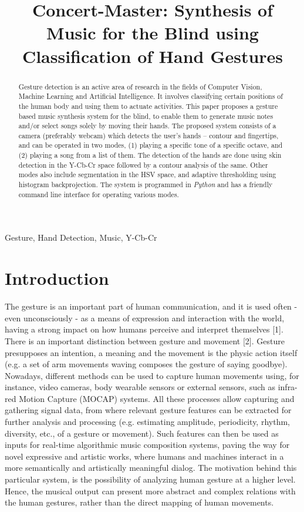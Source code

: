 \documentclass[letterpaper, 10 pt, twoside, conference]{ieeeconf}
\title{Concert-Master: Synthesis of Music for the Blind using Classification of Hand Gestures}
\begin{document}
%
\maketitle
%
\begin{abstract}

Gesture detection is an active area of research in the fields of Computer Vision,
Machine Learning and Artificial Intelligence. It involves classifying certain
positions of the human body and using them to actuate activities. This paper
proposes a gesture based music synthesis system for the blind, to enable them
to generate music notes and/or select songs solely by moving their hands. The
proposed system consists of a camera (preferably webcam) which detects the user's
hands -- contour and fingertips, and can be operated in two modes, (1) playing a
specific tone of a specific octave, and (2) playing a song from a list of them.
The detection of the hands are done using skin detection in the Y-Cb-Cr space
followed by a contour analysis of the same. Other modes also include segmentation
in the HSV space, and adaptive thresholding using histogram backprojection.
The system is programmed in \textit{Python} and has a friendly command line
interface for operating various modes.
\end{abstract}
%
\begin{keywords}
Gesture, Hand Detection, Music, Y-Cb-Cr
\end{keywords}
%
\section{Introduction}
\label{sec:intro}

The gesture is an important part of human communication,
and it is used often - even unconsciously - as a means of expression and interaction with the world, having a strong impact on how humans perceive and interpret themselves [1]. There is an important distinction between gesture and movement [2]. Gesture presupposes an intention, a meaning and the movement is the physic action itself (e.g. a set of arm movements waving composes the gesture of saying goodbye). Nowadays, different methods can be used to capture human
movements using, for instance, video cameras, body wearable sensors or external sensors, such as infra-red Motion Capture (MOCAP) systems. All these processes allow capturing and gathering signal data, from where relevant gesture features can be extracted for further analysis and processing (e.g. estimating amplitude, periodicity, rhythm, diversity, etc., of a gesture or movement). Such features can then be used as inputs for real-time algorithmic music composition systems, paving the way for novel expressive and artistic works, where humans and machines interact in a more semantically and artistically meaningful dialog. The motivation behind this particular system, is the possibility of analyzing human gesture at a higher level. Hence, the musical output can present more abstract and complex relations with the human gestures, rather than the direct mapping of human movements.
\end{document}
